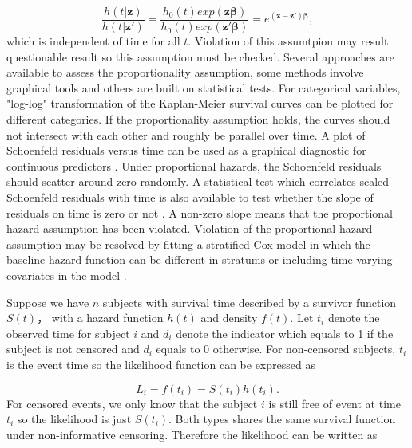 \documentclass{article}
\numberwithin{equation}{section}
\begin{document}
\begin{equation}
\frac{h(t|\bm{z})}{h(t|\bm{z'})} = \frac{h_0(t)exp(\bm{z}\bm{\beta})}{h_0(t)exp(\bm{z'}\bm{\beta})}=e^{(\bm{z}-\bm{z'})\bm{\beta}},
\end{equation} 
which is independent of time for all $t$. Violation of this assumtpion may result questionable result so this assumption must be checked. Several approaches are available to assess the proportionality assumption, some methods involve graphical tools and others are built on statistical tests. For categorical variables, "log-log" transformation of the Kaplan-Meier survival curves can be plotted for different categories. If the proportionality assumption holds, the curves should not intersect with each other and roughly be parallel over time. A plot  of Schoenfeld residuals versus time can be used as a graphical diagnostic for continuous predictors \cite{grambsch1994proportional}. Under proportional hazards, the Schoenfeld residuals should scatter around zero randomly. A statistical test which correlates scaled Schoenfeld residuals with time is also available to test whether the slope of residuals on time is zero or not \cite{grambsch1994proportional}. A non-zero slope means that the proportional hazard assumption has been violated. Violation of the proportional hazard assumption may be resolved by fitting a stratified Cox model in which the baseline hazard function can be different in stratums or including time-varying covariates in the model \cite{george2014survival}.


Suppose we have $n$ subjects with survival time described by a survivor function $S(t)$， with a hazard function $h(t)$ and density $f(t)$. Let $t_i$ denote the observed time for subject $i$ and $d_i$ denote the indicator which equals to 1 if the subject is not censored and $d_i$  equals to 0 otherwise. For non-censored subjects, $t_i$ is the event time so the likelihood function can be expressed as 

\begin{equation}
L_i=f(t_i)=S(t_i)h(t_i).
\end{equation}
 For censored events, we only know that the subject $i$ is still free of event at time $t_i$ so the likelihood is just $S(t_i)$. Both types shares the same survival function under non-informative censoring. Therefore the likelihood can be written as 
 
\end{document}
